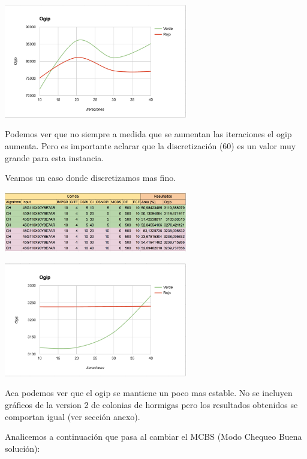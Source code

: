 \begin{center}
\includegraphics[width=0.6\textwidth]{imagenes/grafico15}
\end{center}

Podemos ver que no siempre a medida que se aumentan las iteraciones el ogip aumenta. Pero es importante aclarar que la discretizaci\'on (60) es un valor muy grande para esta instancia. 

\newpage
Veamos un caso donde discretizamos mas fino.

\begin{center}
\includegraphics[width=0.6\textwidth]{imagenes/tabla18}
\end{center}

\begin{center}
\includegraphics[width=0.6\textwidth]{imagenes/grafico18}
\end{center}

Aca podemos ver que el ogip se mantiene un poco mas estable. No se incluyen gr\'aficos de la version 2 de colonias de hormigas pero los resultados obtenidos se comportan igual (ver secci\'on anexo).

Analicemos a continuaci\'on que pasa al cambiar el MCBS (Modo Chequeo Buena soluci\'on):

